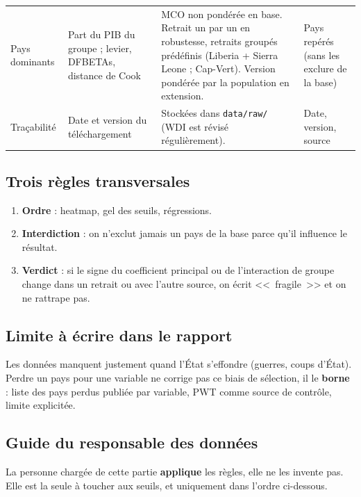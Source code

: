 \documentclass[21pt,a4paper]{article}
\begin{document}
{\begin{longtable}{@{}L{2.5cm}L{3.3cm}L{6.2cm}L{3.2cm}@{}}
			\addlinespace
			Pays dominants & Part du PIB du groupe ; levier, DFBETAs, distance de Cook & MCO non pondérée en base. Retrait un par un en robustesse, retraits groupés prédéfinis (Liberia + Sierra Leone ; Cap-Vert). Version pondérée par la population en extension. & Pays repérés (sans les exclure de la base) \\
			\addlinespace
			Traçabilité & Date et version du téléchargement & Stockées dans \texttt{data/raw/} (WDI est révisé régulièrement). & Date, version, source \\
		\end{longtable}
	}
	
	\subsection{Trois règles transversales}
	
	\begin{enumerate}
		\item \textbf{Ordre} : heatmap, gel des seuils, régressions.
		\item \textbf{Interdiction} : on n'exclut jamais un pays de la base parce qu'il influence le résultat.
		\item \textbf{Verdict} : si le signe du coefficient principal ou de l'interaction de groupe change dans un retrait ou avec l'autre source, on écrit <<~fragile~>> et on ne rattrape pas.
	\end{enumerate}
	
	\subsection{Limite à écrire dans le rapport}
	
	Les données manquent justement quand l'État s'effondre (guerres, coups d'État). Perdre un pays pour une variable ne corrige pas ce biais de sélection, il le \textbf{borne} : liste des pays perdus publiée par variable, PWT comme source de contrôle, limite explicitée.
	
	\subsection{Guide du responsable des données}
	\label{sec:guide}
	
	La personne chargée de cette partie \textbf{applique} les règles, elle ne les invente pas. Elle est la seule à toucher aux seuils, et uniquement dans l'ordre ci-dessous.
	
\end{document}
